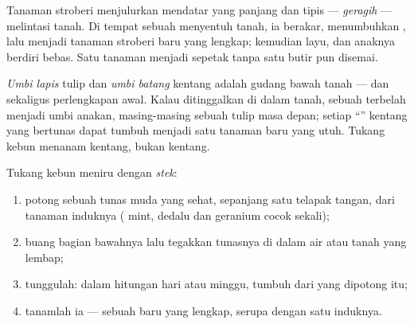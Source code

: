 \begin{example}\label{ex:g4:plants-without-seeds:runner}
Tanaman stroberi menjulurkan  mendatar yang panjang dan tipis
--- \emph{geragih} --- melintasi tanah. Di tempat
sebuah  menyentuh tanah, ia berakar, menumbuhkan , lalu
menjadi tanaman stroberi baru yang lengkap;  kemudian layu,
dan anaknya berdiri bebas. Satu tanaman menjadi sepetak tanpa satu
butir  pun disemai.
\end{example}

\begin{example}\label{ex:g4:plants-without-seeds:bulbtuber}
\emph{Umbi lapis} tulip dan \emph{umbi
batang} kentang adalah gudang bawah tanah --- dan
sekaligus perlengkapan awal. Kalau ditinggalkan di dalam tanah, sebuah
 terbelah menjadi umbi anakan, masing-masing sebuah tulip
masa depan; setiap ``'' kentang yang bertunas dapat tumbuh menjadi
satu tanaman baru yang utuh. Tukang kebun menanam kentang, bukan 
kentang.
\end{example}

\begin{method}\label{met:g4:plants-without-seeds:cutting}
Tukang kebun meniru  dengan
\emph{stek}:
\begin{enumerate}
  \item potong sebuah tunas muda yang sehat, sepanjang satu telapak
        tangan, dari tanaman induknya ( mint, dedalu dan geranium
        cocok sekali);
  \item buang  bagian bawahnya lalu tegakkan tunasnya di dalam air
        atau tanah yang lembap;
  \item tunggulah: dalam hitungan hari atau minggu,  tumbuh dari
         yang dipotong itu;
  \item tanamlah ia --- sebuah  baru yang lengkap, serupa
        dengan satu induknya.
\end{enumerate}
\end{method}

